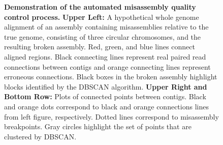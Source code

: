 \documentclass[10pt]{article}
\begin{document}
\begin{figure}[hp]
\caption{\textbf{Demonstration of the automated misassembly quality control process.}
\textbf{Upper Left:}  A hypothetical whole genome alignment of an assembly containing misassemblies relative to the true genome,
consisting of three circular chromosomes, and the 
resulting broken assembly. Red, green, and blue lines connect aligned regions. Black connecting lines represent real paired read 
connections between contigs and orange connecting lines represent erroneous connections. Black boxes in the broken assembly highlight
blocks identified by the DBSCAN algorithm. \textbf{Upper Right and Bottom Row:} Plots of connected points between contigs. Black and orange dots 
correspond to black and orange connections lines from left figure, respectively. Dotted lines correspond
to misassembly breakpoints. Gray circles highlight the set of points that are clustered by DBSCAN. }
\label{fig:03}
\end{figure}

\clearpage
\end{document}
